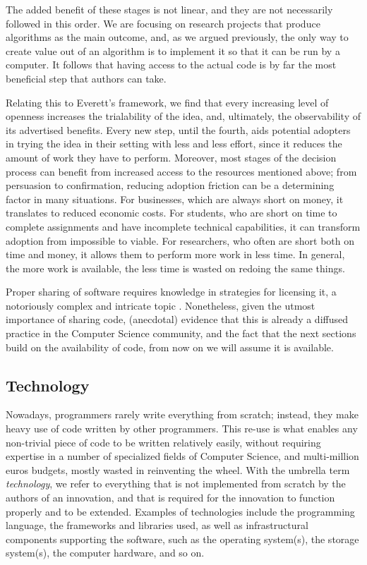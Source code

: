 \documentclass[12pt]{article}
\begin{document}
The added benefit of these stages is not linear, and they are not necessarily followed in this order. We are focusing on research projects that produce algorithms as the main outcome, and, as we argued previously, the only way to create value out of an algorithm is to implement it so that it can be run by a computer. It follows that having access to the actual code is by far the most beneficial step that authors can take.

Relating this to Everett's framework, we find that every increasing level of openness increases the trialability of the idea, and, ultimately, the observability of its advertised benefits. Every new step, until the fourth, aids potential adopters in trying the idea in their setting with less and less effort, since it reduces the amount of work they have to perform. Moreover, most stages of the decision process can benefit from increased access to the resources mentioned above; from persuasion to confirmation, reducing adoption friction can be a determining factor in many situations. For businesses, which are always short on money, it translates to reduced economic costs. For students, who are short on time to complete assignments and have incomplete technical capabilities, it can transform adoption from impossible to viable. For researchers, who often are short both on time and money, it allows them to perform more work in less time. In general, the more work is available, the less time is wasted on redoing the same things.

Proper sharing of software requires knowledge in strategies for licensing it, a notoriously complex and intricate topic \citep{licensing}. Nonetheless, given the utmost importance of sharing code, (anecdotal) evidence that this is already a diffused practice in the Computer Science community, and the fact that the next sections build on the availability of code, from now on we will assume it is available.

\subsection{Technology}
\label{sec:orgd279c2b}
Nowadays, programmers rarely write everything from scratch; instead, they make heavy use of code written by other programmers. This re-use is what enables any non-trivial piece of code to be written relatively easily, without requiring expertise in a number of specialized fields of Computer Science, and multi-million euros budgets, mostly wasted in reinventing the wheel. With the umbrella term \emph{technology}, we refer to everything that is not implemented from scratch by the authors of an innovation, and that is required for the innovation to function properly and to be extended. Examples of technologies include the programming language, the frameworks and libraries used, as well as infrastructural components supporting the software, such as the operating system(s), the storage system(s), the computer hardware, and so on.
\end{document}

